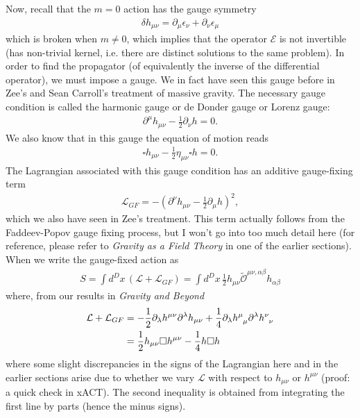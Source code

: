 \documentclass{book}
\theoremstyle{definition}
\newcommand{\p}{\partial}
\newcommand{\lag}{\mathcal{L}}
\newcommand{\nn}{\nonumber}
\newcommand{\f}[2]{\frac{#1}{#2}}
\newcommand{\lp}{\left(}
\newcommand{\rp}{\right)}
\begin{document}
Now, recall that the $m=0$ action has the gauge symmetry
\begin{align}
\delta h_{\mu\nu} = \p_\mu \epsilon_\nu + \p_\nu \epsilon_\mu
\end{align}
which is broken when $m\neq 0$, which implies that the operator $\mathcal{E}$ is not invertible (has non-trivial kernel, i.e. there are distinct solutions to the same problem). In order to find the propagator (of equivalently the inverse of the differential operator), we must impose a gauge. We in fact have seen this gauge before in Zee's and Sean Carroll's treatment of massive gravity. The necessary gauge condition is called the harmonic gauge or de Donder gauge or Lorenz gauge:
\begin{align}
\p^\mu h_{\mu\nu} - \f{1}{2}\p_\nu h = 0.
\end{align}   
We also know that in this gauge the equation of motion reads
\begin{align}\label{no-source}
\square h_{\mu\nu} - \f{1}{2}\eta_{\mu\nu}\square h  =0.
\end{align}
The Lagrangian associated with this gauge condition has an additive gauge-fixing term
\begin{align}
\lag_{GF} = -\lp \p^\nu h_{\mu\nu} - \f{1}{2}\p_\mu h \rp^2,
\end{align}
which we also have seen in Zee's treatment. This term actually follows from the Faddeev-Popov gauge fixing process, but I won't go into too much detail here (for reference, please refer to \textit{Gravity as a Field Theory} in one of the earlier sections). \\

When we write the gauge-fixed action as
\begin{align}
S = \int d^Dx\, (\lag + \lag_{GF}) = \int d^Dx\, \f{1}{2}h_{\mu\nu}\tilde{\mathcal{O}}^{\mu\nu,\alpha\beta}h_{\alpha\beta}
\end{align}
where, from our results in \textit{Gravity and Beyond}
\begin{align}
\lag + \lag_{GF} &= -\f{1}{2}\p_\lambda h^{\mu\nu}\p^\lambda h_{\mu\nu} +\f{1}{4} \p_\lambda \tensor{h}{^\mu_\mu} \p^\lambda \tensor{h}{^\nu_\nu} \nn\\
&= \f{1}{2}h_{\mu\nu}\square h^{\mu\nu} - \f{1}{4}h\square h
\end{align}
where some slight discrepancies in the signs of the Lagrangian here and in the earlier sections arise due to whether we vary $\lag$ with respect to  $h_{\mu\nu}$ or $h^{\mu\nu}$ (proof: a quick check in xACT). The second inequality is obtained from integrating the first line by parts (hence the minus signs). \\
\end{document}
